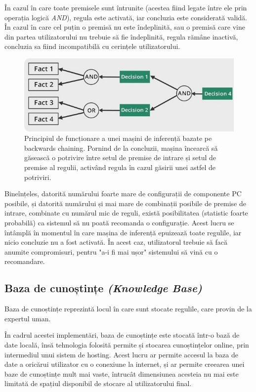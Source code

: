 \documentclass[12pt]{article}
\begin{document}
        În cazul în care toate premisele sunt întrunite (acestea fiind legate între ele prin operația logică \textit{AND}), regula este activată, iar concluzia este considerată validă. În cazul în care cel puțin o premisă nu este îndeplinită, sau o premisă care vine din partea utilizatorului nu trebuie să fie îndeplinită, regula rămâne inactivă, concluzia sa fiind incompatibilă cu cerințele utilizatorului.

        \begin{figure}
            \centering
            \includegraphics[width=\textwidth]{images/back_chain.png}
            \caption{Principiul de funcționare a unei mașini de inferență bazate pe backwards chaining. Pornind de la concluzii, mașina încearcă să găsească o potrivire între setul de premise de intrare și setul de premise al regulii, activând regula în cazul găsirii unei astfel de potriviri.}
        \end{figure}

        Bineînțeles, datorită numărului foarte mare de configurații de componente PC posibile, și datorită numărului și mai mare de combinații posibile de premise de intrare, combinate cu numărul mic de reguli, există posibilitatea (statistic foarte probabilă) ca sistemul să nu poată recomanda o configurație. Acest lucru se întâmplă în momentul în care mașina de inferență epuizează toate regulile, iar nicio concluzie nu a fost activată. În acest caz, utilizatorul trebuie să facă anumite compromisuri, pentru "a-i fi mai ușor" sistemului să vină cu o recomandare.

        \subsection{Baza de cunoștințe \textit{(Knowledge Base)}}
        Baza de cunoștințe reprezintă locul în care sunt stocate regulile, care provin de la expertul uman.

        În cadrul acestei implementări, baza de cunoștințe este stocată într-o bază de date locală, însă tehnologia folosită permite și stocarea cunoștințelor online, prin intermediul unui sistem de hosting. Acest lucru ar permite accesul la baza de date a oricărui utilizator cu o conexiune la internet, și ar permite creearea unei baze de cunoștințe mult mai vaste, întrucât dimensiunea acesteia nu mai este limitată de spațiul disponibil de stocare al utilizatorului final.
\end{document}
